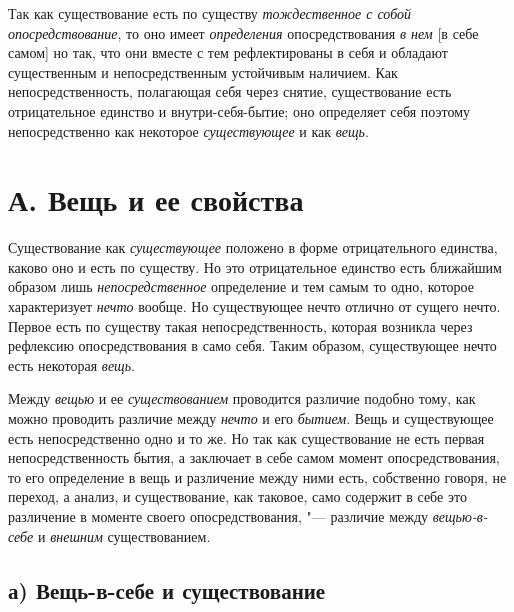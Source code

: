 Так как существование есть по существу
{\em тождественное с собой опосредствование}, то оно
имеет {\em определения} опосредствования
{\em в нем} [в себе самом] но так, что они вместе с тем
рефлектированы в себя и обладают существенным и непосредственным устойчивым
наличием. Как непосредственность, полагающая себя через снятие,
существование есть отрицательное единство и внутри-себя-бытие; оно
определяет себя поэтому непосредственно как некоторое
{\em существующее} и как
{\em вещь}.


\section[А. Вещь и ее свойства]{А. Вещь и ее свойства}

Существование как {\em существующее} положено в форме отрицательного
единства, каково оно и есть по существу. Но это отрицательное единство есть
ближайшим образом лишь {\em непосредственное}
определение и тем самым то одно, которое характеризует
{\em нечто} вообще. Но существующее нечто отлично от
сущего нечто. Первое есть по существу такая непосредственность, которая
возникла через рефлексию опосредствования в само себя. Таким образом,
существующее нечто есть некоторая {\em вещь}.

Между {\em вещью} и ее
{\em существованием} проводится различие подобно тому,
как можно проводить различие между {\em нечто} и его
{\em бытием}. Вещь и существующее есть непосредственно
одно и то же. Но так как существование не есть первая непосредственность
бытия, а заключает в себе самом момент опосредствования, то его определение
в вещь и различение между ними есть, собственно говоря, не переход, а
анализ, и существование, как таковое, само содержит в себе это различение в
моменте своего опосредствования, "--- различие между
{\em вещью-в-себе} и {\em внешним} существованием.


\subsection[а) Вещь-в-себе и существование]{а) Вещь-в-себе и существование}

